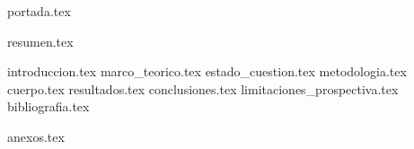 \documentclass[a4paper,openany,oneside,12pt]{report}
\begin{document}
  {portada.tex}
  \setcounter{page}{2} %

  {resumen.tex}
  \clearpage
  \tableofcontents
  \clearpage
  \listoffigures 
  \clearpage
  \listoftables
  \clearpage
  {introduccion.tex}
  {marco_teorico.tex}
  {estado_cuestion.tex}
  {metodologia.tex}
  {cuerpo.tex}
  {resultados.tex}
  {conclusiones.tex}
  {limitaciones_prospectiva.tex}
  {bibliografia.tex}
  \printindex %
  {anexos.tex}
\end{document}
